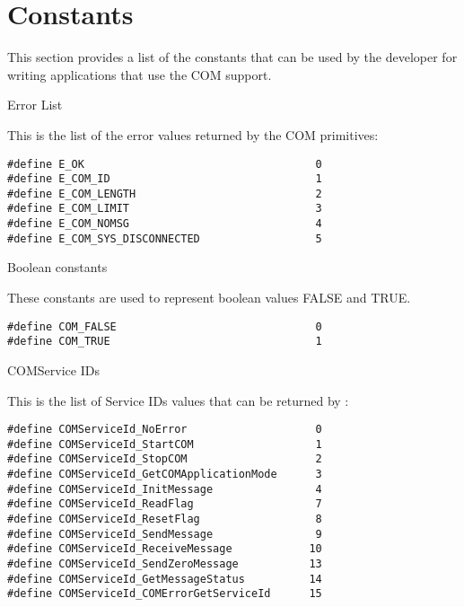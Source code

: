 \pagebreak

\section{Constants}
\label{sec:constants}

This section provides a list of the constants that can be used by the developer
for writing applications that use the COM support.

\begin{constant}{Error List}
  \begin{constantdescription}
    This is the list of the error values returned by the COM primitives:
    \begin {lstlisting}
#define E_OK                                    0
#define E_COM_ID                                1
#define E_COM_LENGTH                            2
#define E_COM_LIMIT                             3
#define E_COM_NOMSG                             4
#define E_COM_SYS_DISCONNECTED                  5
    \end{lstlisting}
  \end{constantdescription}
\end{constant}

\begin{constant}{Boolean constants}
\label{subsec:const_bool}
  \begin{constantdescription}
    These constants are used to represent boolean values FALSE and TRUE.
    \begin {lstlisting}
#define COM_FALSE                               0
#define COM_TRUE                                1
    \end{lstlisting}
  \end{constantdescription}
\end{constant}

\begin{constant}{COMService IDs}
  \begin{constantdescription}
    This is the list of Service IDs values that can be returned by
    :
    \begin {lstlisting}
#define COMServiceId_NoError                    0
#define COMServiceId_StartCOM                   1
#define COMServiceId_StopCOM                    2
#define COMServiceId_GetCOMApplicationMode      3
#define COMServiceId_InitMessage                4
#define COMServiceId_ReadFlag                   7
#define COMServiceId_ResetFlag                  8
#define COMServiceId_SendMessage                9
#define COMServiceId_ReceiveMessage            10
#define COMServiceId_SendZeroMessage           13
#define COMServiceId_GetMessageStatus          14
#define COMServiceId_COMErrorGetServiceId      15

    \end{lstlisting}
  \end{constantdescription}
\end{constant}


